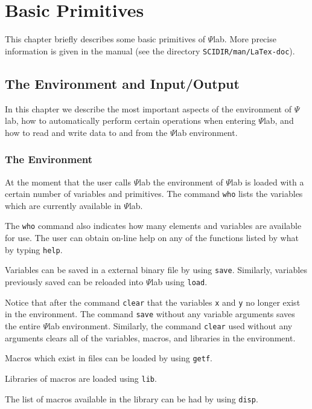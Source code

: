 \chapter{Basic Primitives}
\label{ch5}
This chapter briefly describes some basic primitives of $\Psi$lab.
More precise information is given in the manual 
(see the directory {\tt SCIDIR/man/LaTex-doc}).
\section{The Environment and Input/Output}
	In this chapter we describe the most important aspects
of the environment of $\Psi$lab, how to automatically
perform certain operations when entering $\Psi$lab,
and how to read and write data
to and from the $\Psi$lab environment.

\subsection{The Environment}
\label{s5.1}

	At the moment that the user calls $\Psi$lab the environment
of $\Psi$lab is loaded with a certain number of variables and primitives.
The command {\tt who} lists the variables 
which are currently available in $\Psi$lab.  

The {\tt who} command also indicates how many elements and variables
are available for use.  The user can obtain on-line help on any of 
the functions listed by what by typing {\tt help}.

	Variables can be saved in a external binary
file by using {\tt save}.  
Similarly, variables previously saved can be
reloaded into $\Psi$lab using {\tt load}.

Notice that after the command {\tt clear} 
that the variables {\tt x} and
{\tt y} no longer exist in the environment.  
The command {\tt save} without any variable arguments saves the entire 
$\Psi$lab environment.  Similarly,
the command {\tt clear} used
without any arguments clears all of the variables, macros, and libraries
in the environment.

	Macros which exist in files can be loaded by using 
{\tt getf}.  

Libraries of macros are loaded
using {\tt lib}.  

The list of macros available in the library can be had by using {\tt disp}.

